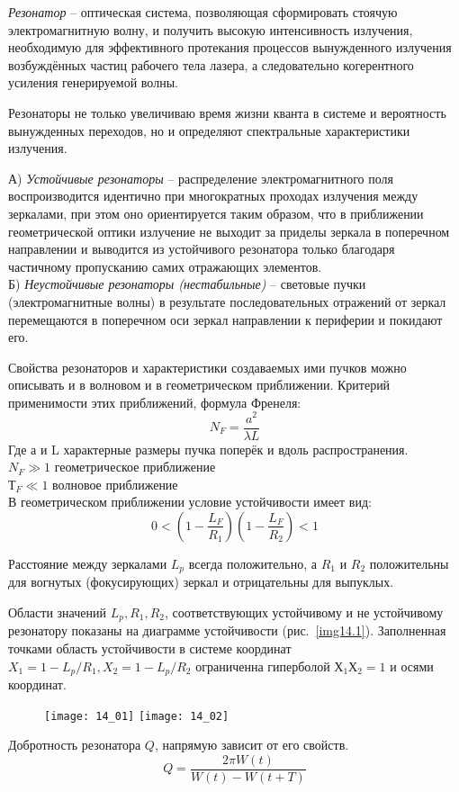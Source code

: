 
\emph{Резонатор} -- оптическая система, позволяющая сформировать стоячую 
электромагнитную волну, и получить высокую интенсивность излучения, 
необходимую для эффективного протекания процессов вынужденного излучения 
возбуждённых частиц рабочего тела лазера, а следовательно когерентного 
усиления генерируемой волны.

Резонаторы не только увеличиваю время жизни кванта в системе и вероятность 
вынужденных переходов, но и определяют спектральные характеристики излучения.

А) \emph{Устойчивые резонаторы} -- распределение электромагнитного поля 
воспроизводится идентично при многократных проходах излучения между зеркалами, 
при этом оно ориентируется таким образом, что в приближении геометрической 
оптики излучение не выходит за приделы зеркала в поперечном направлении и 
выводится из устойчивого резонатора только благодаря частичному пропусканию 
самих отражающих элементов. \\
Б) \emph{Неустойчивые резонаторы (нестабильные)} -- световые пучки 
(электромагнитные волны) в результате последовательных отражений от зеркал 
перемещаются в поперечном оси зеркал направлении к периферии и покидают его. 

Свойства резонаторов и характеристики создаваемых ими пучков можно описывать 
и в волновом и в геометрическом приближении. Критерий применимости этих 
приближений, формула Френеля:
\[
	N_F = \frac{a^2}{\lambda L}
\]
Где а и L характерные размеры пучка поперёк и вдоль распространения.\\
\( N_F \gg 1 \) геометрическое приближение \\
\( Т_F \ll 1 \) волновое приближение \\
В геометрическом приближении условие устойчивости имеет вид:
\[
	0 < \left(1-\frac{L_F}{R_1}\right)\left(1-\frac{L_F}{R_2}\right) < 1 
\]

Расстояние между зеркалами \( L_p \) всегда положительно, а \( R_1 \) и 
\( R_2 \) положительны для вогнутых (фокусирующих) зеркал и отрицательны для 
выпуклых.

Области значений \( L_p, R_1, R_2 \), соответствующих устойчивому и не 
устойчивому резонатору показаны на диаграмме устойчивости 
(рис.~\ref{img14.1}). Заполненная точками область устойчивости в системе 
координат \( X_1 = 1-L_p/R_1, X_2 = 1-L_p/R_2 \) ограниченна гиперболой 
\( Х_1 Х_2 = 1 \) и осями координат.
\begin{figure}[h]
    \center
    \texttt{[image: 14\_01]}
    \label{img14.1}\hfill
    \texttt{[image: 14\_02]}
    \label{img14.2}
\end{figure}

Добротность резонатора \( Q \), напрямую зависит от его свойств.
\[
	Q = \frac{2\pi W(t)}{W(t)-W(t+T)}
\]